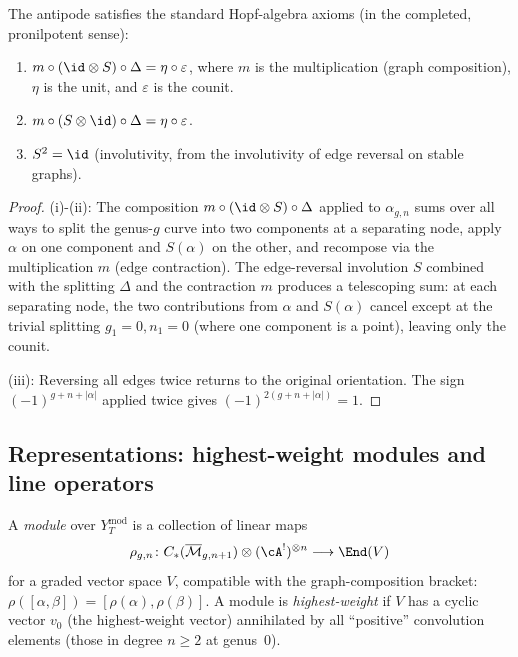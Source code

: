 \begin{proposition}
The antipode satisfies the standard Hopf-algebra axioms (in the
completed, pronilpotent sense):
\begin{enumerate}[label=\textup{(\roman*)}]
\item $m \circ (\id \otimes S) \circ \Delta = \eta \circ
\varepsilon$, where $m$ is the multiplication (graph composition),
$\eta$ is the unit, and $\varepsilon$ is the counit.
\item $m \circ (S \otimes \id) \circ \Delta = \eta \circ
\varepsilon$.
\item $S^2 = \id$ (involutivity, from the involutivity of
edge reversal on stable graphs).
\end{enumerate}
\end{proposition}

\begin{proof}
(i)-(ii): The composition $m \circ (\id \otimes S) \circ \Delta$
applied to $\alpha_{g,n}$ sums over all ways to split the genus-$g$
curve into two components at a separating node, apply $\alpha$ on
one component and $S(\alpha)$ on the other, and recompose via the
multiplication $m$ (edge contraction). The edge-reversal involution
$S$ combined with the splitting $\Delta$ and the contraction $m$
produces a telescoping sum: at each separating node, the two
contributions from $\alpha$ and $S(\alpha)$ cancel except at the
trivial splitting $g_1 = 0, n_1 = 0$ (where one component is a
point), leaving only the counit.

(iii): Reversing all edges twice returns to the original orientation.
The sign $(-1)^{g+n+|\alpha|}$ applied twice gives $(-1)^{2(g+n+|\alpha|)}
= 1$.
\end{proof}

\subsection{Representations: highest-weight modules and line operators}

\begin{definition}
A \emph{module} over $Y_T^{\mathrm{mod}}$ is a collection of linear
maps
\[
\rho_{g,n} \colon
C_\ast(\overline{\mathcal{M}}_{g,n+1})
\otimes (\cA^!)^{\otimes n}
\longrightarrow \End(V)
\]
for a graded vector space $V$, compatible with the graph-composition
bracket: $\rho([\alpha, \beta]) = [\rho(\alpha), \rho(\beta)]$.
A module is \emph{highest-weight} if $V$ has a cyclic vector
$v_0$ (the highest-weight vector) annihilated by all ``positive''
convolution elements (those in degree $n \ge 2$ at genus~$0$).
\end{definition}

